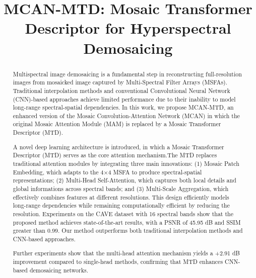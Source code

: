 \documentclass[conference]{IEEEtran}
\begin{document}
\title{MCAN-MTD: Mosaic Transformer Descriptor for Hyperspectral Demosaicing }


\author{
}

\maketitle

\begin{abstract}
Multispectral image demosaicing is a fundamental step in reconstructing full-resolution images
 from mosaicked image captured by Multi-Spectral Filter Arrays (MSFAs). 
 Traditional interpolation methods and conventional Convolutional Neural Network (CNN)-based 
 approaches achieve limited performance due to their inability to model long-range 
 spectral-spatial dependencies. In this work, we propose MCAN-MTD, an enhanced version 
 of the Mosaic Convolution-Attention Network (MCAN) in which the original Mosaic Attention 
 Module (MAM) is replaced by a Mosaic Transformer Descriptor (MTD).

A novel deep learning architecture is introduced, in which a Mosaic Transformer Descriptor (MTD)
 serves as the core attention mechanism.The MTD replaces traditional attention modules by 
 integrating three main innovations: 
(1) Mosaic Patch Embedding, which adapts to the 4×4 MSFA to produce spectral-spatial representations;
(2) Multi-Head Self-Attention, which captures both local details and global informations
across spectral bands; and (3) Multi-Scale Aggregation, which effectively combines features 
at different resolutions. 
This design efficiently models long-range dependencies while remaining computationally 
efficient by reducing the resolution. Experiments on the CAVE dataset with 16 spectral bands 
show that the proposed method achieves state-of-the-art results,
    with a PSNR of 45.95 dB and SSIM greater than 0.99. Our method outperforms 
    both traditional interpolation methods and CNN-based approaches. 

    Further experiments show that the multi-head attention mechanism yields a +2.91 dB 
    improvement compared to single-head methods, confirming that MTD enhances CNN-based 
    demosaicing networks.

\end{abstract}
\end{document}
